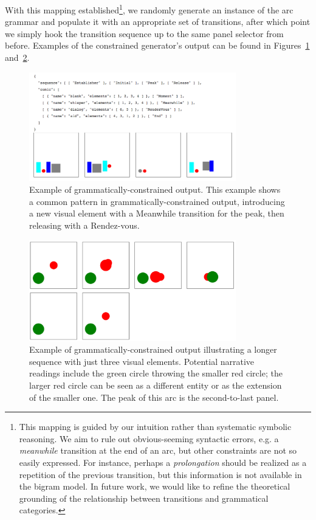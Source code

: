 
\newcommand{\caveat}{
This mapping is guided by our intuition rather than 
systematic symbolic reasoning. We aim to rule out obvious-seeming
syntactic errors, e.g. a \emph{meanwhile} transition at the end of an arc, but
other constraints are not so easily expressed. For instance, perhaps a
\emph{prolongation} should be realized as a repetition of the previous
transition, but this information is not available in the bigram model. In
future work, we would like to refine the theoretical grounding of the
relationship between transitions and grammatical categories.}

With this mapping established\footnote{\caveat}, we randomly generate an instance of the
arc grammar and populate it with an appropriate set of transitions, after
which point we simply hook the transition sequence up to the same panel
selector from before.
Examples of the constrained generator's output can be found in
Figures~\ref{fig:outgood} and~\ref{fig:redgreen}.


\begin{figure}
\centering
\includegraphics[width=9cm]{output-constrained-canonical.png}
\caption{Example of grammatically-constrained output.
This example shows a common pattern in grammatically-constrained output,
introducing a new visual element with a Meanwhile transition for the peak,
then releasing with a Rendez-vous.
}
\label{fig:outgood}
\end{figure}

\begin{figure}
\centering
\includegraphics[width=9cm]{comicgen-output-4.png}
\caption{Example of grammatically-constrained output
illustrating a longer sequence with just three visual elements. Potential
narrative readings include the green circle throwing the smaller red
circle; the larger red circle can be seen as a different entity or as the
extension of the smaller one. The peak of this arc is the second-to-last
panel.
}
\label{fig:redgreen}
\end{figure}



